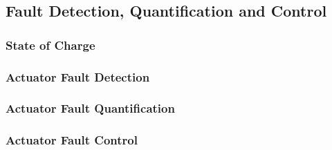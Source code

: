 \subsection{Fault Detection, Quantification and Control}
\subsubsection{State of Charge}
\subsubsection{Actuator Fault Detection}
\subsubsection{Actuator Fault Quantification}
\subsubsection{Actuator Fault Control}